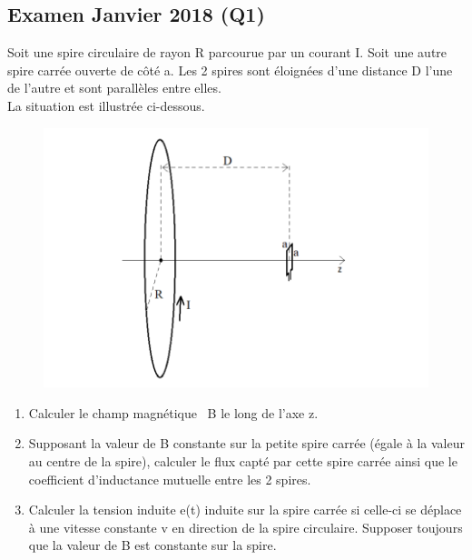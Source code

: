 \subsection{Examen Janvier 2018 (Q1)}
Soit une spire circulaire de rayon R parcourue par un courant I. Soit une autre spire carrée ouverte de côté a. Les 2 spires sont éloignées d’une distance D l’une de l’autre et sont parallèles entre elles. \\
La situation est illustrée ci-dessous.
\begin{figure}[h!]
    \centering
    \includegraphics[width = 15cm]{TpQEx_Champs/Q1_TheoChampsJanv2018.PNG}
    \label{fig:Q1_TheoChampsJanv2018}
\end{figure}

\begin{enumerate}
    \item Calculer le champ magnétique ~B le long de l’axe z.
    \item Supposant la valeur de B constante sur la petite spire carrée (égale à la valeur au centre de la spire), calculer le flux capté par cette spire carrée ainsi que le coefficient d’inductance mutuelle entre les 2 spires.
    \item Calculer la tension induite e(t) induite sur la spire carrée si celle-ci se déplace à une vitesse constante v en direction de la spire circulaire. Supposer toujours que la valeur de B est constante sur la spire.
\end{enumerate}

\newpage
